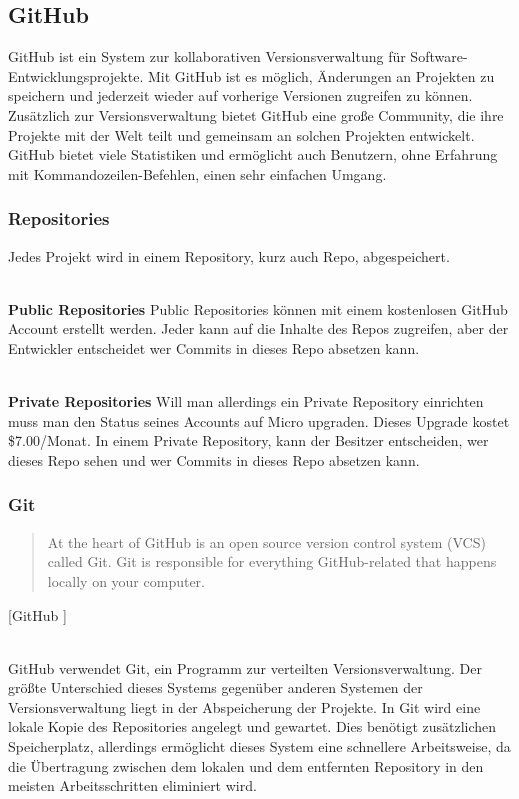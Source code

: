\documentclass[FIPLY_base.tex]{subfiles}
\begin{document}
\subsection{GitHub}
GitHub ist ein System zur kollaborativen Versionsverwaltung für Software-Entwicklungsprojekte.
Mit GitHub ist es möglich, Änderungen an Projekten zu speichern und jederzeit wieder auf vorherige Versionen zugreifen zu können.
Zusätzlich zur Versionsverwaltung bietet GitHub eine große Community, die ihre Projekte mit der Welt teilt und gemeinsam an solchen Projekten entwickelt.
GitHub bietet viele Statistiken und ermöglicht auch Benutzern, ohne Erfahrung mit Kommandozeilen-Befehlen, einen sehr einfachen Umgang. 

\subsubsection{Repositories}
Jedes Projekt wird in einem Repository, kurz auch Repo, abgespeichert.

\ \\
\textbf{Public Repositories}  \newline
Public Repositories können mit einem kostenlosen GitHub Account erstellt werden.
Jeder kann auf die Inhalte des Repos zugreifen, aber der Entwickler entscheidet wer Commits in dieses Repo absetzen kann.

\ \\
\textbf{Private Repositories} \newline
Will man allerdings ein Private Repository einrichten muss man den Status seines Accounts auf Micro upgraden.
Dieses Upgrade kostet \$7.00/Monat. In einem Private Repository, kann der Besitzer entscheiden, wer dieses Repo sehen und wer Commits in dieses Repo absetzen kann.

\subsubsection{Git}
\begin{quote}
At the heart of GitHub is an open source version control system (VCS) called Git. Git is responsible for everything GitHub-related that happens locally on your computer.
\end{quote}
[GitHub \cite{githubSetUpGit}]

\ \\
GitHub verwendet Git, ein Programm zur verteilten Versionsverwaltung.
Der größte Unterschied dieses Systems gegenüber anderen Systemen der Versionsverwaltung liegt in der Abspeicherung der Projekte.
In Git wird eine lokale Kopie des Repositories angelegt und gewartet.
Dies benötigt zusätzlichen Speicherplatz, allerdings ermöglicht dieses System eine schnellere Arbeitsweise, da die Übertragung zwischen dem lokalen und dem entfernten Repository in den meisten Arbeitsschritten eliminiert wird. 
\end{document}
